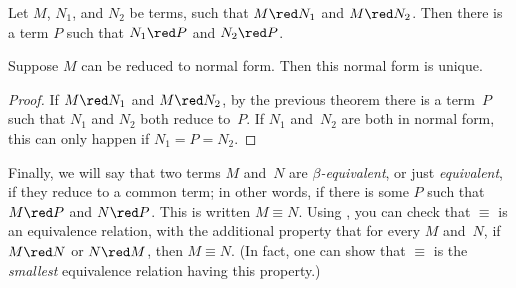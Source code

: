 \documentclass[../../include/open-logic-section]{subfiles}
\begin{document}

\begin{thm}
Let $M$, $N_1$, and $N_2$ be terms, such that $M \red N_1$ and $M \red
N_2$. Then there is a term $P$ such that $N_1 \red P$ and $N_2 \red P$.
\end{thm}

\begin{cor}
Suppose $M$ can be reduced to normal form. Then this normal form is
unique.
\end{cor}

\begin{proof}
If $M \red N_1$ and $M \red N_2$, by the previous theorem there is a
term~$P$ such that $N_1$ and $N_2$ both reduce to~$P$. If $N_1$
and~$N_2$ are both in normal form, this can only happen if $N_1 = P =
N_2$.
\end{proof}

Finally, we will say that two terms $M$ and~$N$ are
\emph{$\beta$-equivalent}, or just \emph{equivalent}, if they reduce
to a common term; in other words, if there is some $P$ such that $M
\red P$ and $N \red P$. This is written $M \equiv N$. Using
, you can check that $\equiv$ is an
equivalence relation, with the additional property that for every $M$
and~$N$, if $M \red N$ or $N \red M$, then $M \equiv N$. (In fact, one
can show that $\equiv$ is the \emph{smallest} equivalence relation
having this property.)
\end{document}
